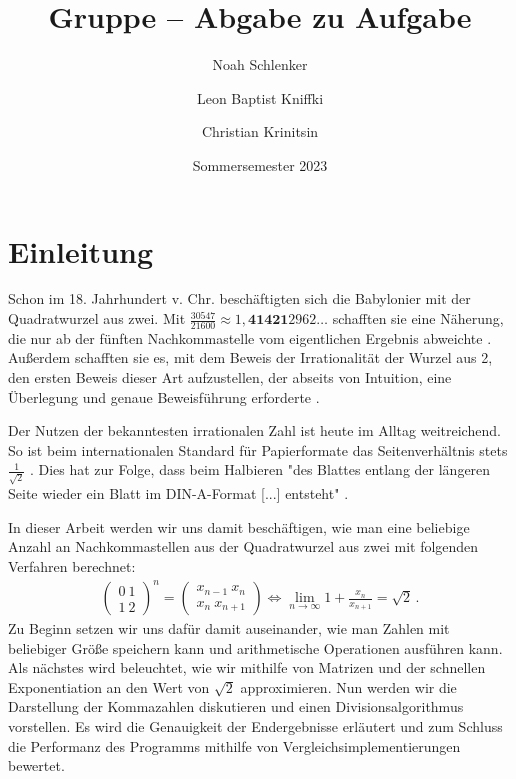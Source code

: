 \documentclass[course=erap]{aspdoc}
\author{Noah Schlenker \and Leon Baptist Kniffki \and Christian Krinitsin}
\date{Sommersemester 2023} %
\title{Gruppe \theGroup{} -- Abgabe zu Aufgabe \theNumber}
\begin{document}
\maketitle

\section{Einleitung} \label{sec:einleitung}
Schon im 18. Jahrhundert v. Chr. beschäftigten sich die Babylonier mit der Quadratwurzel aus zwei. Mit $\tfrac {30547}{21600} \approx 1,\textbf{41421}2962\dots$ schafften sie eine Näherung, die nur
ab der fünften Nachkommastelle vom eigentlichen Ergebnis abweichte \cite{quadratwurzel_aus_2}. Außerdem schafften sie es, mit dem Beweis der Irrationalität der Wurzel aus 2, den ersten Beweis 
dieser Art aufzustellen, der abseits von Intuition, eine Überlegung und genaue Beweisführung erforderte \cite{lemonde_wurzel_2}. \par

Der Nutzen der bekanntesten irrationalen Zahl ist heute im Alltag weitreichend. So ist beim internationalen Standard für Papierformate das Seitenverhältnis stets $\frac{1}{\sqrt{2}}$ \cite{papierformat}. 
Dies hat zur Folge, dass beim Halbieren "des Blattes entlang der längeren Seite wieder ein Blatt im DIN-A-Format [...] entsteht" \cite{quadratwurzel_aus_2}. \par

In dieser Arbeit werden wir uns damit beschäftigen, wie man eine beliebige Anzahl an Nachkommastellen aus der Quadratwurzel aus zwei mit folgenden Verfahren berechnet:
\begin{align}
    \begin{pmatrix} 0 \ 1 \\ 1 \ 2\end{pmatrix}^n = \begin{pmatrix} x_{n-1} \ x_n \\ x_n \ x_{n+1}\end{pmatrix} \Leftrightarrow \lim_{n \to \infty} 1 + \frac{x_n}{x_{n+1}} = \sqrt{2} \nonumber \, .
\end{align}
Zu Beginn setzen wir uns dafür damit auseinander, 
wie man Zahlen mit beliebiger Größe speichern kann und arithmetische Operationen ausführen kann. Als nächstes wird beleuchtet, wie wir mithilfe von Matrizen und der schnellen Exponentiation
an den Wert von $\sqrt{2}$ approximieren. Nun werden wir die Darstellung der Kommazahlen diskutieren und einen Divisionsalgorithmus vorstellen. Es wird die Genauigkeit der Endergebnisse erläutert und zum Schluss die Performanz des Programms mithilfe von Vergleichsimplementierungen bewertet.
\end{document}
